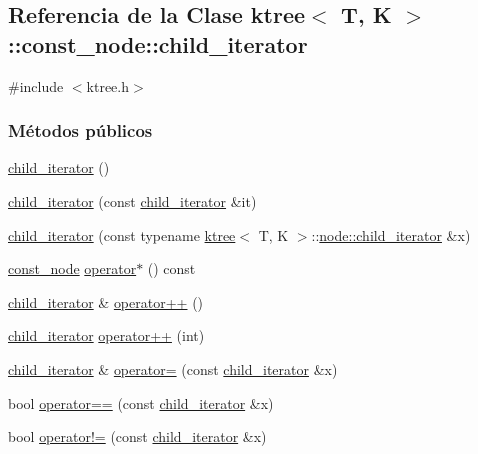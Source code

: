 \hypertarget{classktree_1_1const__node_1_1child__iterator}{}\subsection{Referencia de la Clase ktree$<$ T, K $>$\+:\+:const\+\_\+node\+:\+:child\+\_\+iterator}
\label{classktree_1_1const__node_1_1child__iterator}


{\ttfamily \#include $<$ktree.\+h$>$}

\subsubsection*{Métodos públicos}
\begin{DoxyCompactItemize}
\item 
\hyperlink{classktree_1_1const__node_1_1child__iterator_a36f7cbb9f02c3e4c3e25070ce3a87a2c}{child\+\_\+iterator} ()
\item 
\hyperlink{classktree_1_1const__node_1_1child__iterator_a8d0ffe0300c09441d2b1c7d3403c3d9f}{child\+\_\+iterator} (const \hyperlink{classktree_1_1const__node_1_1child__iterator}{child\+\_\+iterator} \&it)
\item 
\hyperlink{classktree_1_1const__node_1_1child__iterator_af9896daf4d9a3295bea225aee6bbad14}{child\+\_\+iterator} (const typename \hyperlink{classktree}{ktree}$<$ T, K $>$\+::\hyperlink{classktree_1_1node_1_1child__iterator}{node\+::child\+\_\+iterator} \&x)
\item 
\hyperlink{classktree_1_1const__node}{const\+\_\+node} \hyperlink{classktree_1_1const__node_1_1child__iterator_a4944d141b74829f5365e122395f201b6}{operator$\ast$} () const 
\item 
\hyperlink{classktree_1_1const__node_1_1child__iterator}{child\+\_\+iterator} \& \hyperlink{classktree_1_1const__node_1_1child__iterator_a8e5a4b135075f76d06e788022fc22f01}{operator++} ()
\item 
\hyperlink{classktree_1_1const__node_1_1child__iterator}{child\+\_\+iterator} \hyperlink{classktree_1_1const__node_1_1child__iterator_a7af6b840aa4bfd18e026f7150309a292}{operator++} (int)
\item 
\hyperlink{classktree_1_1const__node_1_1child__iterator}{child\+\_\+iterator} \& \hyperlink{classktree_1_1const__node_1_1child__iterator_ab77fe4b8ce1ec46b2d19b525bc823904}{operator=} (const \hyperlink{classktree_1_1const__node_1_1child__iterator}{child\+\_\+iterator} \&x)
\item 
bool \hyperlink{classktree_1_1const__node_1_1child__iterator_a426c9c06c10f6b67341364320fc6f054}{operator==} (const \hyperlink{classktree_1_1const__node_1_1child__iterator}{child\+\_\+iterator} \&x)
\item 
bool \hyperlink{classktree_1_1const__node_1_1child__iterator_ad6da5e26c8af537e7fd53296f8ed4c84}{operator!=} (const \hyperlink{classktree_1_1const__node_1_1child__iterator}{child\+\_\+iterator} \&x)
\end{DoxyCompactItemize}
